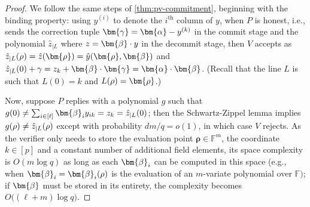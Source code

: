\documentclass[10pt,a4paper]{article}
\theoremstyle{definition}
\newcommand{\field}{\mathbb{F}}
\newcommand{\pcommitlength}{p}
\newcommand{\pcommitstring}{y}
\newcommand{\dimension}{m}
\newcommand{\degree}{d}
\newcommand{\fieldsize}{q}
\newcommand{\fingerprinttuple}{\bm{\rho}}
\renewcommand{\line}{L}
\def\fe#1{
    \ifnum#1=1
        \alpha
    \else
    \ifnum#1=2
        \beta
    \else
    \ifnum#1=3
        \gamma
    \fi\fi\fi
}
\def\rfe#1{
    \ifnum#1=1
        \rho
    \else
    \ifnum#1=2
        \sigma
    \else
    \fi\fi
}
\begin{document}
\begin{proof}
    We follow the same steps of \cref{thm:pv-commitment}, beginning with the binding property: using $\pcommitstring^{(i)}$ to denote the $i^\text{th}$ column of $\pcommitstring$, when $P$ is honest, i.e., sends the correction tuple $\bm{\fe3} = \bm{\fe1} - \pcommitstring^{(k)}$ in the \textsf{commit} stage and the polynomial $\hat z_{|\line}$ where $z = \bm{\fe2} \cdot \pcommitstring$ in the \textsf{decommit} stage, then $V$ accepts as $\hat z_{|\line}(\rfe1) = \hat z(\fingerprinttuple) = \hat \pcommitstring(\fingerprinttuple, \bm{\fe2})$ and $\hat z_{|\line}(0) + \fe3 = z_k + \bm{\fe2} \cdot \bm{\fe3} = \bm{\fe1} \cdot \bm{\fe2}$. (Recall that the line $\line$ is such that $\line(0) = k$ and $\line(\rfe1) = \fingerprinttuple$.)
    
    Now, suppose $P$ replies with a polynomial $g$ such that $g(0) \neq \sum_{i \in [\ell]} \bm{\fe2}_i
    \pcommitstring_{ik} = z_k = \hat z_{|\line}(0)$; then the Schwartz-Zippel lemma implies $g(\rfe1) \neq \hat z_{|\line}(\rfe1)$ except with probability $\degree \dimension / \fieldsize = o(1)$, in which case $V$ rejects. As the verifier only needs to store the evaluation point $\fingerprinttuple \in \field^\dimension$, the coordinate $k \in [\pcommitlength]$ and a constant number of additional field elements, its space complexity is $O(\dimension \log \fieldsize)$ as long as each $\bm{\fe2}_i$ can be computed in this space (e.g., when $\bm{\fe2}_i = \bm{\fe2}_i(\rfe1)$ is the evaluation of an $\dimension$-variate polynomial over $\field)$; if $\bm{\fe2}$ must be stored in its entirety, the complexity becomes $O\big((\ell + \dimension) \log \fieldsize\big)$.


\end{proof}
\end{document}
